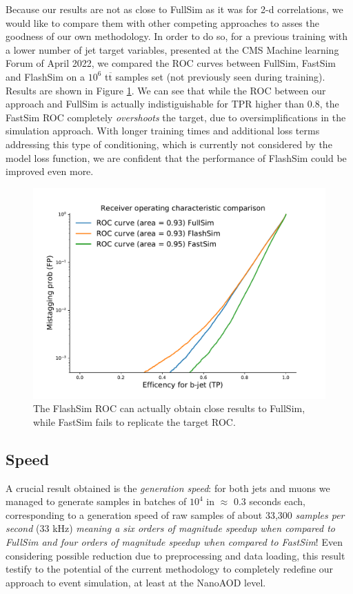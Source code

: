 Because our results are not as close to FullSim as it was for 2-d correlations, we would like to compare them with other competing approaches to asses the goodness of our own methodology. In order to do so, for a previous training with a lower number of jet target variables, presented at the CMS Machine learning Forum of April 2022, we compared the ROC curves between FullSim, FastSim and FlashSim on a $10^{6}$ t$\overline{\text{t}}$ samples set (not previously seen during training). Results are shown in Figure \ref{fig:allrocs}. We can see that while the ROC between our approach and FullSim is actually indistiguishable for TPR higher than 0.8, the FastSim ROC completely \emph{overshoots} the target, due to oversimplifications in the simulation approach. With longer training times and additional loss terms addressing this type of conditioning, which is currently not considered by the model loss function, we are confident that the performance of FlashSim could be improved even more.

\begin{figure}
    \centering
    \includegraphics[width=\linewidth]{gfx/ch5/allrocs.pdf}
    \caption[ROC Comparison]{The FlashSim ROC can actually obtain close results to FullSim, while FastSim fails to replicate the target ROC.}
    \label{fig:allrocs}
\end{figure}


\subsection{Speed}

A crucial result obtained is the \emph{generation speed}: for both jets and muons we managed to generate samples in batches of $10^{4}$ in $\approx$ 0.3 seconds each, corresponding to a generation speed of raw samples of about 33,300 \emph{samples per second} (33 kHz) \emph{meaning a six orders of magnitude speedup when compared to FullSim and four orders of magnitude speedup when compared to FastSim}! Even considering possible reduction due to preprocessing and data loading, this result testify to the potential of the current methodology to completely redefine our approach to event simulation, at least at the NanoAOD level.

